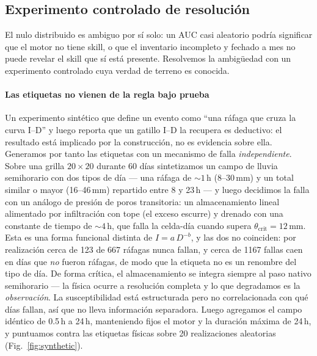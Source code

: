 \documentclass[authoryear,preprint,review,12pt]{elsarticle}
\begin{document}
\subsection{Experimento controlado de resolución}
\label{sec:synthetic}

El nulo distribuido es ambiguo por sí solo: un AUC casi aleatorio podría significar
que el motor no tiene skill, o que el inventario incompleto y fechado a mes no
puede revelar el skill que sí está presente. Resolvemos la ambigüedad con un
experimento controlado cuya verdad de terreno es conocida.

\paragraph{Las etiquetas no vienen de la regla bajo prueba}
Un experimento sintético que define un evento como ``una ráfaga que cruza la curva
I--D'' y luego reporta que un gatillo I--D la recupera es deductivo: el resultado
está implicado por la construcción, no es evidencia sobre ella. Generamos por tanto
las etiquetas con un mecanismo de falla \emph{independiente}. Sobre una grilla
$20\times20$ durante 60 días sintetizamos un campo de lluvia semihorario con dos
tipos de día --- una ráfaga de ${\sim}1$\,h (8--30\,mm) y un total similar o mayor
(16--46\,mm) repartido entre 8 y 23\,h --- y luego decidimos la falla con un
análogo de presión de poros transitoria: un almacenamiento lineal alimentado por
infiltración con tope (el exceso escurre) y drenado con una constante de tiempo de
${\sim}4$\,h, que falla la celda-día cuando supera
$\theta_\mathrm{crit}=12$\,mm. Esta es una forma funcional distinta de
$I=a\,D^{-b}$, y las dos no coinciden: por realización cerca de 123 de 667 ráfagas
nunca fallan, y cerca de 1167 fallas caen en días que \emph{no} fueron ráfagas, de
modo que la etiqueta no es un renombre del tipo de día. De forma crítica, el
almacenamiento se integra siempre al paso nativo semihorario --- la física ocurre a
resolución completa y lo que degradamos es la \emph{observación}. La
susceptibilidad está estructurada pero no correlacionada con qué días fallan, así
que no lleva información separadora. Luego agregamos el campo idéntico de 0.5\,h a
24\,h, manteniendo fijos el motor y la duración máxima de 24\,h, y puntuamos contra
las etiquetas físicas sobre 20 realizaciones aleatorias
(Fig.~\ref{fig:synthetic}).
\end{document}
